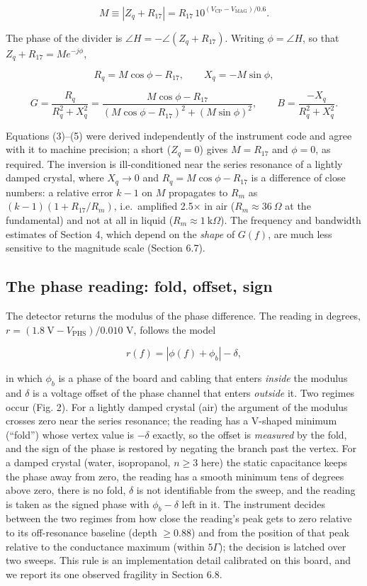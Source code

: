 \documentclass[11pt,a4paper]{article}
\begin{document}
\[M \equiv |Z_q + R_{17}| = R_{17}\,10^{(V_\mathrm{CP} - V_\mathrm{MAG})/0.6}. \tag{3}\]

The phase of the divider is \(\angle H = -\angle(Z_q + R_{17})\).
Writing \(\phi = \angle H\), so that \(Z_q + R_{17} = M e^{-j\phi}\),

\[R_q = M\cos\phi - R_{17},\qquad X_q = -M\sin\phi, \tag{4}\]

\[G = \frac{R_q}{R_q^2 + X_q^2} = \frac{M\cos\phi - R_{17}}{(M\cos\phi - R_{17})^2 + (M\sin\phi)^2},\qquad B = \frac{-X_q}{R_q^2 + X_q^2}. \tag{5}\]

Equations (3)--(5) were derived independently of the instrument code and
agree with it to machine precision; a short (\(Z_q = 0\)) gives
\(M = R_{17}\) and \(\phi = 0\), as required. The inversion is
ill-conditioned near the series resonance of a lightly damped crystal,
where \(X_q \to 0\) and \(R_q = M\cos\phi - R_{17}\) is a difference of
close numbers: a relative error \(k - 1\) on \(M\) propagates to \(R_m\)
as \((k-1)(1 + R_{17}/R_m)\), i.e.~amplified 2.5× in air
(\(R_m \approx 36\ \Omega\) at the fundamental) and not at all in liquid
(\(R_m \approx 1\ \mathrm{k}\Omega\)). The frequency and bandwidth
estimates of Section 4, which depend on the \emph{shape} of \(G(f)\),
are much less sensitive to the magnitude scale (Section 6.7).

\hypertarget{the-phase-reading-fold-offset-sign}{%
\subsection{The phase reading: fold, offset,
sign}\label{the-phase-reading-fold-offset-sign}}

The detector returns the modulus of the phase difference. The reading in
degrees, \(r = (1.8\ \mathrm{V} - V_\mathrm{PHS})/0.010\) V, follows the
model

\[r(f) = |\phi(f) + \phi_b| - \delta, \tag{6}\]

in which \(\phi_b\) is a phase of the board and cabling that enters
\emph{inside} the modulus and \(\delta\) is a voltage offset of the
phase channel that enters \emph{outside} it. Two regimes occur (Fig. 2).
For a lightly damped crystal (air) the argument of the modulus crosses
zero near the series resonance; the reading has a V-shaped minimum
(``fold'') whose vertex value is \(-\delta\) exactly, so the offset is
\emph{measured} by the fold, and the sign of the phase is restored by
negating the branch past the vertex. For a damped crystal (water,
isopropanol, \(n \ge 3\) here) the static capacitance keeps the phase
away from zero, the reading has a smooth minimum tens of degrees above
zero, there is no fold, \(\delta\) is not identifiable from the sweep,
and the reading is taken as the signed phase with \(\phi_b - \delta\)
left in it. The instrument decides between the two regimes from how
close the reading's peak gets to zero relative to its off-resonance
baseline (depth \(\ge 0.88\)) and from the position of that peak
relative to the conductance maximum (within \(5\Gamma\)); the decision
is latched over two sweeps. This rule is an implementation detail
calibrated on this board, and we report its one observed fragility in
Section 6.8.
\end{document}
